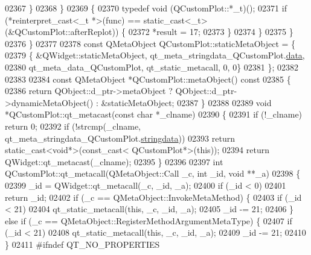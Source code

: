 \begin{DoxyCode}
02367             \}
02368         \}
02369         \{
02370             \textcolor{keyword}{typedef} void (QCustomPlot::*\_t)();
02371             \textcolor{keywordflow}{if} (*reinterpret\_cast<\_t *>(func) == \textcolor{keyword}{static\_cast<}\_t\textcolor{keyword}{>}(&QCustomPlot::afterReplot)) \{
02372                 *result = 17;
02373             \}
02374         \}
02375     \}
02376 \}
02377 
02378 \textcolor{keyword}{const} QMetaObject QCustomPlot::staticMetaObject = \{
02379     \{ &QWidget::staticMetaObject, qt\_meta\_stringdata\_QCustomPlot.\hyperlink{a00016_a294e0b700c66ea0a3f528f255fa52fff}{data},
02380       qt\_meta\_data\_QCustomPlot,  qt\_static\_metacall, 0, 0\}
02381 \};
02382 
02383 
02384 \textcolor{keyword}{const} QMetaObject *QCustomPlot::metaObject()\textcolor{keyword}{ const}
02385 \textcolor{keyword}{}\{
02386     \textcolor{keywordflow}{return} QObject::d\_ptr->metaObject ? QObject::d\_ptr->dynamicMetaObject() : &staticMetaObject;
02387 \}
02388 
02389 \textcolor{keywordtype}{void} *QCustomPlot::qt\_metacast(\textcolor{keyword}{const} \textcolor{keywordtype}{char} *\_clname)
02390 \{
02391     \textcolor{keywordflow}{if} (!\_clname) \textcolor{keywordflow}{return} 0;
02392     \textcolor{keywordflow}{if} (!strcmp(\_clname, qt\_meta\_stringdata\_QCustomPlot.\hyperlink{a00016_a06c7bf819765fdc7a40739cfb2bb681c}{stringdata}))
02393         \textcolor{keywordflow}{return} \textcolor{keyword}{static\_cast<}\textcolor{keywordtype}{void}*\textcolor{keyword}{>}(\textcolor{keyword}{const\_cast<} QCustomPlot*\textcolor{keyword}{>}(\textcolor{keyword}{this}));
02394     \textcolor{keywordflow}{return} QWidget::qt\_metacast(\_clname);
02395 \}
02396 
02397 \textcolor{keywordtype}{int} QCustomPlot::qt\_metacall(QMetaObject::Call \_c, \textcolor{keywordtype}{int} \_id, \textcolor{keywordtype}{void} **\_a)
02398 \{
02399     \_id = QWidget::qt\_metacall(\_c, \_id, \_a);
02400     \textcolor{keywordflow}{if} (\_id < 0)
02401         \textcolor{keywordflow}{return} \_id;
02402     \textcolor{keywordflow}{if} (\_c == QMetaObject::InvokeMetaMethod) \{
02403         \textcolor{keywordflow}{if} (\_id < 21)
02404             qt\_static\_metacall(\textcolor{keyword}{this}, \_c, \_id, \_a);
02405         \_id -= 21;
02406     \} \textcolor{keywordflow}{else} \textcolor{keywordflow}{if} (\_c == QMetaObject::RegisterMethodArgumentMetaType) \{
02407         \textcolor{keywordflow}{if} (\_id < 21)
02408             qt\_static\_metacall(\textcolor{keyword}{this}, \_c, \_id, \_a);
02409         \_id -= 21;
02410     \}
02411 \textcolor{preprocessor}{#ifndef QT\_NO\_PROPERTIES}

\end{DoxyCode}
